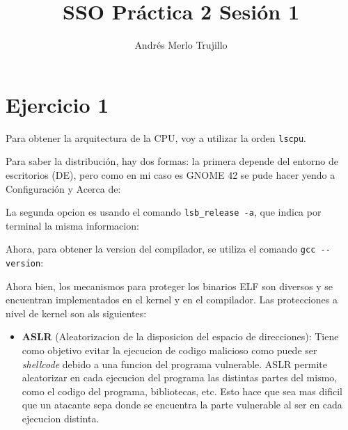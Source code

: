 \documentclass{article}
\title{SSO Práctica 2 Sesión 1}
\author{Andrés Merlo Trujillo}
\date{}
\begin{document}
\maketitle

\tableofcontents

\newpage

\section*{Ejercicio 1}

Para obtener la arquitectura de la CPU, voy a utilizar la orden \verb|lscpu|.



Para saber la distribución, hay dos formas: la primera depende del entorno de escritorios (DE), pero como en mi caso es GNOME 42 se pude hacer yendo a Configuración y Acerca de:


La segunda opcion es usando el comando \verb|lsb_release -a|, que indica por terminal la misma informacion:


Ahora, para obtener la version del compilador, se utiliza el comando \verb|gcc --version|:


Ahora bien, los mecanismos para proteger los binarios ELF son diversos y se encuentran implementados en el kernel y en el compilador. Las protecciones a nivel de kernel son als siguientes:

\begin{itemize}
    \item \textbf{ASLR} (Aleatorizacion de la disposicion del espacio de direcciones): Tiene como objetivo evitar la ejecucion de codigo malicioso como puede ser \textit{shellcode} debido a una funcion del programa vulnerable. ASLR permite aleatorizar en cada ejecucion del programa las distintas partes del mismo, como el codigo del programa, bibliotecas, etc. Esto hace que sea mas dificil que un atacante sepa donde se encuentra la parte vulnerable al ser en cada ejecucion distinta.
\end{itemize}
\end{document}
